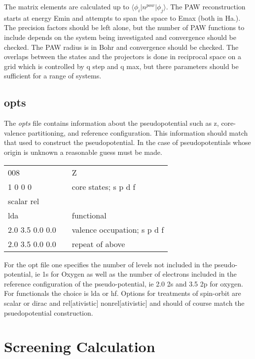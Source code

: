 \documentclass[12pt]{revtex4}
\begin{document}
The matrix elements are calculated up to $\langle \phi_i \vert n^{pow} \vert \phi_j \rangle$. The PAW reconstruction starts at energy Emin and attempts to span the space to Emax (both in Ha.). The precision factors should be left alone, but the number of PAW functions to include depends on the system being investigated and convergence should be checked. The PAW radius is in Bohr and convergence should be checked. The overlaps between the states and the projectors is done in reciprocal space on a grid which is controlled by q step and q max, but there parameters should be sufficient for a range of systems.


\subsection{opts}
The \emph{opts} file contains information about the pseudopotential such as z, core-valence partitioning, and reference configuration. This information should match that used to construct the pseudopotential. In the case of pseudopotentials 
whose origin is unknown a reasonable guess must be made.

\begin{center}
\begin{tabular}{| l | c l |}
\hline
008				& &  Z\\
1 0 0 0			& & core states; s p d f \\
scalar rel			& & \\
lda				& & functional \\
2.0 3.5 0.0 0.0		& & valence occupation; s p d f \\
2.0 3.5 0.0 0.0		& & repeat of above \\
\hline
\end{tabular}
\end{center}

For the opt file one specifies the number of levels not included in the pseudo-potential, ie 1s for Oxygen as well as the number of electrons included in the reference configuration of the pseudo-potential, ie 2.0 2s and 3.5 2p for oxygen. For functionals the choice is lda or hf. Options for treatments of spin-orbit are 
scalar or dirac and rel[ativistic] nonrel[ativistic] and should of course match the psuedopotential 
construction. 

\section{Screening Calculation}
\end{document}
